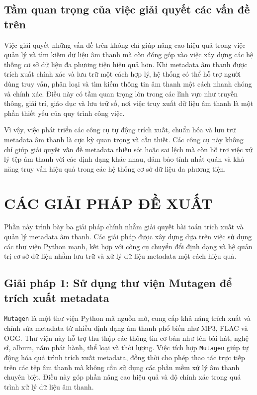 \documentclass[conference]{IEEEtran}
\begin{document}
\subsection{Tầm quan trọng của việc giải quyết các vấn đề trên}

Việc giải quyết những vấn đề trên không chỉ giúp nâng cao hiệu quả trong việc quản lý và tìm kiếm dữ liệu âm thanh mà còn đóng góp vào việc xây dựng các hệ thống cơ sở dữ liệu đa phương tiện hiệu quả hơn. Khi metadata âm thanh được trích xuất chính xác và lưu trữ một cách hợp lý, hệ thống có thể hỗ trợ người dùng truy vấn, phân loại và tìm kiếm thông tin âm thanh một cách nhanh chóng và chính xác. Điều này có tầm quan trọng lớn trong các lĩnh vực như truyền thông, giải trí, giáo dục và lưu trữ số, nơi việc truy xuất dữ liệu âm thanh là một phần thiết yếu của quy trình công việc.

Vì vậy, việc phát triển các công cụ tự động trích xuất, chuẩn hóa và lưu trữ metadata âm thanh là cực kỳ quan trọng và cần thiết. Các công cụ này không chỉ giúp giải quyết vấn đề metadata thiếu sót hoặc sai lệch mà còn hỗ trợ việc xử lý tệp âm thanh với các định dạng khác nhau, đảm bảo tính nhất quán và khả năng truy vấn hiệu quả trong các hệ thống cơ sở dữ liệu đa phương tiện.



\section{CÁC GIẢI PHÁP ĐỀ XUẤT}

Phần này trình bày ba giải pháp chính nhằm giải quyết bài toán trích xuất và quản lý metadata âm thanh. Các giải pháp được xây dựng dựa trên việc sử dụng các thư viện Python mạnh, kết hợp với công cụ chuyển đổi định dạng và hệ quản trị cơ sở dữ liệu nhằm lưu trữ và xử lý dữ liệu metadata một cách hiệu quả.

\subsection{Giải pháp 1: Sử dụng thư viện Mutagen để trích xuất metadata}

\texttt{Mutagen} là một thư viện Python mã nguồn mở, cung cấp khả năng trích xuất và chỉnh sửa metadata từ nhiều định dạng âm thanh phổ biến như MP3, FLAC và OGG. Thư viện này hỗ trợ thu thập các thông tin cơ bản như tên bài hát, nghệ sĩ, album, năm phát hành, thể loại và thời lượng. Việc tích hợp \texttt{Mutagen} giúp tự động hóa quá trình trích xuất metadata, đồng thời cho phép thao tác trực tiếp trên các tệp âm thanh mà không cần sử dụng các phần mềm xử lý âm thanh chuyên biệt. Điều này góp phần nâng cao hiệu quả và độ chính xác trong quá trình xử lý dữ liệu âm thanh.
\end{document}
